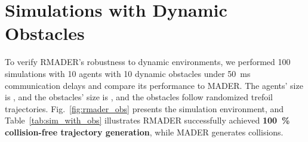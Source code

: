 \section{Simulations with Dynamic Obstacles}

To verify RMADER's robustness to dynamic environments, we performed 100 simulations with 10 agents with 10 dynamic obstacles under \SI{50}{\ms} communication delays and compare its performance to MADER. The agents' size is , and the obstacles' size is , and the obstacles follow randomized trefoil trajectories. Fig.~\ref{fig:rmader_obs} presents the simulation environment, and Table~\ref{tab:sim_with_obs} illustrates RMADER successfully achieved \textbf{\SI{100}{\%} collision-free trajectory generation}, while MADER generates collisions.

\begin{table}[!h]
    \caption{\centering Simulations with obstacles under 50ms comm. delay}
    \label{tab:sim_with_obs}    
    \centering
\end{table}

